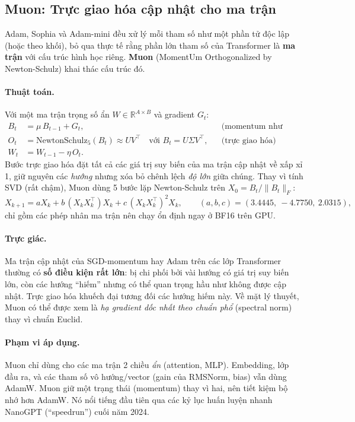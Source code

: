 \subsection{Muon: Trực giao hóa cập nhật cho ma trận}
\label{ssec:muon}
Adam, Sophia và Adam-mini đều xử lý mỗi tham số như một phần tử độc lập (hoặc theo khối), bỏ qua thực tế rằng phần lớn tham số của Transformer là \textbf{ma trận} với cấu trúc hình học riêng. \textbf{Muon} (MomentUm Orthogonalized by Newton-Schulz) \cite{jordan2024muon} khai thác cấu trúc đó.

\paragraph{Thuật toán.} Với một ma trận trọng số ẩn $W \in \mathbb{R}^{A\times B}$ và gradient $G_t$:
\begin{align}
	B_t &= \mu\, B_{t-1} + G_t, && \text{(momentum như SGD)}\\
	O_t &= \text{NewtonSchulz}_5(B_t) \approx U V^\top \quad \text{với } B_t = U\Sigma V^\top, && \text{(trực giao hóa)}\\
	W_t &= W_{t-1} - \eta\, O_t.
\end{align}
Bước trực giao hóa đặt tất cả các giá trị suy biến của ma trận cập nhật về xấp xỉ 1, giữ nguyên các \emph{hướng} nhưng xóa bỏ chênh lệch \emph{độ lớn} giữa chúng. Thay vì tính SVD (rất chậm), Muon dùng 5 bước lặp Newton-Schulz trên $X_0 = B_t/\|B_t\|_F$:
\[
X_{k+1} = a X_k + b\,(X_k X_k^\top) X_k + c\,(X_k X_k^\top)^2 X_k, \qquad (a, b, c) = (3.4445,\ -4.7750,\ 2.0315),
\]
chỉ gồm các phép nhân ma trận nên chạy ổn định ngay ở BF16 trên GPU.

\paragraph{Trực giác.} Ma trận cập nhật của SGD-momentum hay Adam trên các lớp Transformer thường có \textbf{số điều kiện rất lớn}: bị chi phối bởi vài hướng có giá trị suy biến lớn, còn các hướng “hiếm” nhưng có thể quan trọng hầu như không được cập nhật. Trực giao hóa khuếch đại tương đối các hướng hiếm này. Về mặt lý thuyết, Muon có thể được xem là \emph{hạ gradient dốc nhất theo chuẩn phổ} (spectral norm) thay vì chuẩn Euclid.

\paragraph{Phạm vi áp dụng.} Muon chỉ dùng cho các ma trận 2 chiều \emph{ẩn} (attention, MLP). Embedding, lớp đầu ra, và các tham số vô hướng/vector (gain của RMSNorm, bias) vẫn dùng AdamW. Muon giữ một trạng thái (momentum) thay vì hai, nên tiết kiệm bộ nhớ hơn AdamW. Nó nổi tiếng đầu tiên qua các kỷ lục huấn luyện nhanh NanoGPT (“speedrun”) cuối năm 2024.

